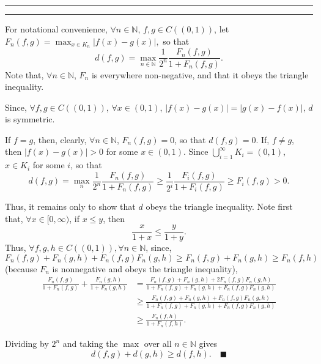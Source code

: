 \documentclass[11pt]{article}
\newcounter{questionCounter}
\newcounter{partCounter}[questionCounter]
\newenvironment{question}[2][\arabic{questionCounter}]{%
    \setcounter{partCounter}{0}%
    \vspace{.25in} \hrule \vspace{0.5em}%
        \noindent{\bf #2}%
    \vspace{0.8em} \hrule \vspace{.10in}%
    \addtocounter{questionCounter}{1}%
}{}
\newcommand{\mqed}{\quad \blacksquare}
\newcommand{\N}{\mathbb{N}} %
\begin{document}
\begin{question}{Problem 7} For notational convenience, $\forall n \in \N$,
$f,g \in C((0,1))$, let $F_n(f,g) = \max_{x \in K_n} |f(x) - g(x)|,$ so that
\[d(f,g) = \max_{n \in \N} \frac{1}{2^n} \frac{F_n(f,g)}{1 + F_n(f,g)}.\]
Note that, $\forall n \in \N$, $F_n$ is everywhere non-negative, and that it
obeys the triangle inequality.

Since, $\forall f,g \in C((0,1))$, $\forall x \in (0,1)$,
$|f(x) - g(x)| = |g(x) - f(x)|$, $d$ is symmetric.

If $f = g$, then, clearly, $\forall n \in \N$,
$F_n(f,g) = 0$, so that $d(f,g) = 0$. If,
$f \neq g$, then $|f(x) - g(x)| > 0$ for some $x \in (0,1)$. Since
$\bigcup_{i = 1}^{\infty} K_i = (0,1)$, $x \in K_i$ for some $i$, so that
\[d(f,g)
 = \max_n \frac{1}{2^n} \frac{F_n(f,g)}
                            {1 + F_n(f,g)}
 \geq \frac{1}{2^i} \frac{F_i(f,g)}
                         {1 + F_i(f,g)}
 \geq F_i(f,g) > 0.
\]

Thus, it remains only to show that $d$ obeys the triangle inequality.
Note first that, $\forall x \in [0,\infty)$, if $x \leq y$, then
\[\frac{x}{1 + x} \leq \frac{y}{1 + y}.\]
Thus, $\forall f,g,h \in C((0,1)), \forall n \in \N$,
since,
\[F_n(f,g) + F_n(g,h) + F_n(f,g)F_n(g,h)
 \geq F_n(f,g) + F_n(g,h)
 \geq F_n(f,h)\]
(because $F_n$ is nonnegative and obeys the triangle inequality),
\begin{align*}
\frac{F_n(f,g)}{1 + F_n(f,g)} + \frac{F_n(g,h)}{1 + F_n(g,h)}
 & =     \frac{F_n(f,g) + F_n(g,h) + 2F_n(f,g)F_n(g,h)}
           {1 + F_n(f,g) + F_n(g,h) + F_n(f,g)F_n(g,h)} \\
 & \geq  \frac{F_n(f,g) + F_n(g,h) + F_n(f,g)F_n(g,h)}
           {1 + F_n(f,g) + F_n(g,h) + F_n(f,g)F_n(g,h)} \\
 & \geq  \frac{F_n(f,h)}
           {1 + F_n(f,h)}.
\end{align*}

Dividing by $2^n$ and taking the $\max$ over all $n \in \N$ gives
\[d(f,g) + d(g,h) \geq d(f,h). \mqed\]
\end{question}
\end{document}
